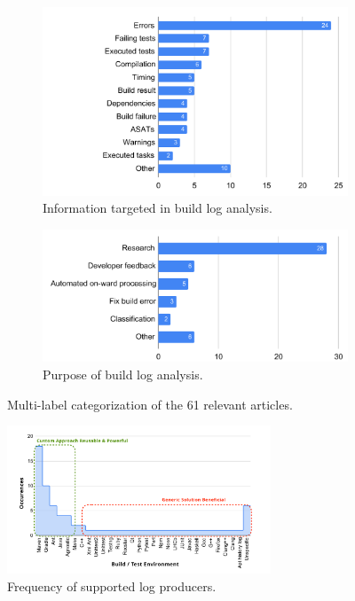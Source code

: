 \begin{figure}
\centering
\begin{subfigure}[t]{\columnwidth}
		\centering
		\includegraphics[width=\columnwidth,
		clip]{img/lit-sur/info_target.pdf}
		\caption{Information targeted in build log analysis.}
		\label{fig:litsur:info_target}

\end{subfigure}\hspace{\fill}
\begin{subfigure}[t]{\columnwidth}
		\centering
				\includegraphics[width=\columnwidth,
				clip]{img/lit-sur/use.pdf}
		\caption{Purpose of build log analysis.}
		\label{fig:litsur:use}

\end{subfigure}

\caption{Multi-label categorization of the 61 relevant articles.}
\end{figure}

\begin{figure}[tbhp]
		\centering
		\includegraphics[width=0.7\textwidth, trim={1.1cm 0.4cm
		1.5cm 0.5cm},
		clip]{img/lit-sur/log_producer_annotated.pdf}
		\caption{Frequency of supported log producers.}
		\label{fig:litsur:log_producer}
\end{figure}

